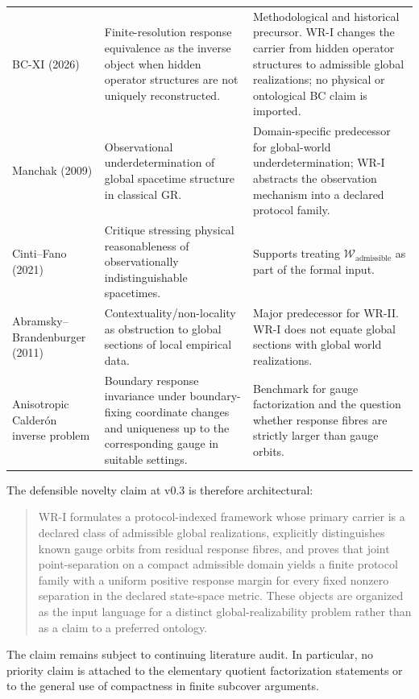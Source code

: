 \documentclass[11pt]{article}
\newcommand{\W}{\mathcal W}
\begin{document}
\begin{longtable}{>{\raggedright\arraybackslash}p{}
                  >{\raggedright\arraybackslash}p{}
                  >{\raggedright\arraybackslash}p{}}
BC-XI (2026) &
Finite-resolution response equivalence as the inverse object when hidden
operator structures are not uniquely reconstructed. &
Methodological and historical precursor. WR-I changes the carrier from hidden
operator structures to admissible global realizations; no physical or
ontological BC claim is imported. \\[5pt]

Manchak (2009) &
Observational underdetermination of global spacetime structure in classical
GR. &
Domain-specific predecessor for global-world underdetermination; WR-I abstracts
the observation mechanism into a declared protocol family. \\[5pt]

Cinti--Fano (2021) &
Critique stressing physical reasonableness of observationally indistinguishable
spacetimes. &
Supports treating $\W_{\mathrm{admissible}}$ as part of the formal input. \\[5pt]

Abramsky--Brandenburger (2011) &
Contextuality/non-locality as obstruction to global sections of local empirical
data. &
Major predecessor for WR-II. WR-I does not equate global sections with global
world realizations. \\[5pt]

Anisotropic Calder\'on inverse problem &
Boundary response invariance under boundary-fixing coordinate changes and
uniqueness up to the corresponding gauge in suitable settings. &
Benchmark for gauge factorization and the question whether response fibres are
strictly larger than gauge orbits. \\
\bottomrule
\end{longtable}

The defensible novelty claim at v0.3 is therefore architectural:
\begin{quote}
WR-I formulates a protocol-indexed framework whose primary carrier is a
declared class of admissible global realizations, explicitly distinguishes
known gauge orbits from residual response fibres, and proves that joint
point-separation on a compact admissible domain yields a finite protocol family
with a uniform positive response margin for every fixed nonzero separation in
the declared state-space metric. These objects are organized as the input
language for a distinct global-realizability problem rather than as a claim to
a preferred ontology.
\end{quote}

The claim remains subject to continuing literature audit. In particular, no
priority claim is attached to the elementary quotient factorization statements
or to the general use of compactness in finite subcover arguments.
\end{document}
